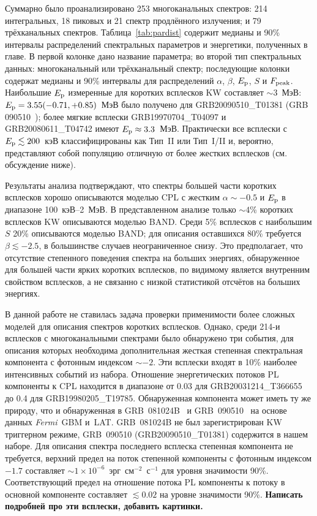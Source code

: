 Суммарно было проанализировано 253 многоканальных спектров: 214 интегральных,
18 пиковых и 21 спектр продлённого излучения; и 79 трёхканальных спектров.
Таблица~\ref{tab:pardist} содержит медианы и 90\% интервалы распределений спектральных
параметров и энергетики, полученных в главе. В первой колонке дано название параметра;
во второй тип спектральных данных: многоканальный или трёхканальный спектр;
последующие колонки содержат медианы и 90\% интервалы для распределений
$\alpha$, $\beta$, $E_{\mathrm{p}}$, $S$ и $F_{\mathrm{peak}}$. Наибольшие $E_{\mathrm{p}}$ измеренные
для коротких всплесков KW составляет $\sim 3$~МэВ: 
$E_{\mathrm{p}} = 3.55(-0.71,+0.85)$~МэВ было получено для GRB20090510\_T01381
(GRB 090510~\citep{Ackermann_2010ApJ_716_1178A});
более мягкие всплески GRB19970704\_T04097 и GRB20080611\_T04742 имеют $E_{\mathrm{p}} \approx 3.3$~МэВ.
Практически все всплески с $E_{\mathrm{p}} \lesssim 200$~кэВ классифицированы как Тип~II или Тип~I/II
и, вероятно, представляют собой популяцию отличную от более жестких всплесков (см. обсуждение ниже).

Результаты анализа подтверждают, что спектры большей части коротких всплесков хорошо
описываются моделью CPL с жестким $\alpha \sim -0.5$ и $E_{\mathrm{p}}$ в диапазоне 100~кэВ--2~МэВ.
В представленном анализе только $\sim 4$\% коротких всплесков KW описываются моделью BAND.
Среди 5\%  всплесков с наибольшим $S$ 20\% описываются моделью BAND; для описания 
оставшихся 80\% требуется $\beta \lesssim -2.5$, в большинстве случаев неограниченное снизу.
Это предполагает, что отсутствие степенного поведения спектра на больших энергиях,
обнаруженное для большей части ярких коротких всплесков, по видимому является внутренним
свойством всплесков, а не связанно с низкой статистикой отсчётов на больших энергиях.

В данной работе не ставилась задача проверки применимости более сложных моделей
для описания спектров коротких всплесков.
Однако, среди 214-и всплесков с многоканальными спектрами было обнаружено три
события, для описания которых необходима дополнительная жесткая степенная 
спектральная компонента с фотонным индексом $\sim -2$. Эти всплески входят в 10\%
наиболее интенсивных событий из набора. Отношение энергетических потоков PL
компоненты к CPL находится в диапазоне от 0.03 для GRB20031214\_T366655 до
0.4 для GRB19980205\_T19785. Обнаруженная компонента может иметь ту же природу,
что и обнаруженная в GRB~081024B~\citep{Abdo_2010ApJ_712_558A} и 
GRB~090510~\citep{Ackermann_2010ApJ_716_1178A} на основе данных \textit{Fermi}~GBM и~LAT.
GRB~081024B не был зарегистрирован KW триггерном режиме, GRB~090510 (GRB20090510\_T01381)
содержится в нашем наборе. Для описания спектра последнего всплеска степенная 
компонента не требуется, верхний предел на поток степенной компоненты с фотонным 
индексом $-1.7$ составляет $\sim 1 \times 10^{-6}$~эрг~см$^{-2}$~с$^{-1}$ для 
уровня значимости 90\%. Соответствующий предел на отношение потока PL компоненты 
к потоку в основной компоненте составляет $\lesssim 0.02$ на уровне значимости 90\%.
\textbf{Написать подробней про эти всплески, добавить картинки.}

